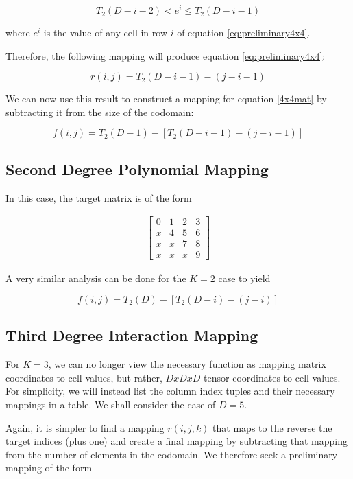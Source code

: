 \documentclass{article}
\begin{document}
\begin{equation}
T_2(D-i-2) < e^i \le T_2(D-i-1)
\end{equation}

where $e^i$ is the value of any cell in row $i$ of equation \ref{eq:preliminary4x4}.

Therefore, the following mapping will produce equation \ref{eq:preliminary4x4}:

\begin{equation}
r(i, j) = T_2(D-i-1) - (j - i - 1)
\end{equation}

We can now use this result to construct a mapping for equation \ref{4x4mat} by subtracting it from the size of the codomain:

\begin{equation}
f(i, j) = T_2(D-1) - [T_2(D-i-1) - (j - i - 1)]
\end{equation}

\subsection{Second Degree Polynomial Mapping}
In this case, the target matrix is of the form

\begin{align}
\begin{bmatrix}
0 & 1 & 2 & 3 \\
x & 4 & 5 & 6 \\
x & x & 7 & 8 \\
x & x & x & 9
\end{bmatrix}
\label{eq:4x4mat}
\end{align}

A very similar analysis can be done for the $K=2$ case to yield

\begin{equation}
f(i, j) = T_2(D) - [T_2(D-i) - (j - i)]
\end{equation}

\subsection{Third Degree Interaction Mapping}
For $K=3$, we can no longer view the necessary function as mapping matrix coordinates to cell values, but rather, $DxDxD$ tensor coordinates to cell values.
For simplicity, we will instead list the column index tuples and their necessary mappings in a table.
We shall consider the case of $D=5$.

Again, it is simpler to find a mapping $r(i, j, k)$ that maps to the reverse the target indices (plus one) and create a final mapping by subtracting that mapping from the number of elements in the codomain.
We therefore seek a preliminary mapping of the form
\end{document}
